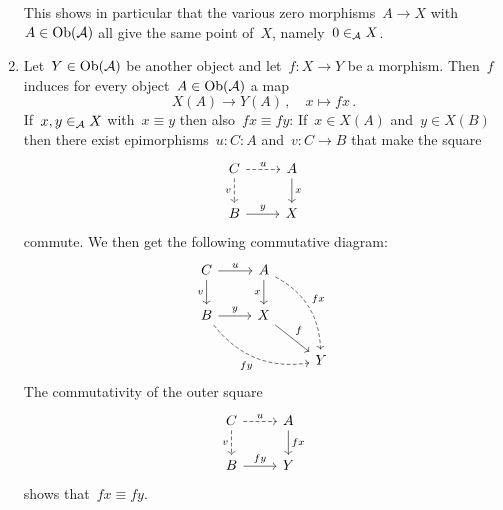 \begin{remarkdefinition}[continues=abstract points]
\begin{enumerate}[start=3]
      This shows in particular that the various zero morphisms~$A \to X$ with~$A \in \operatorname{Ob}(\mathcal{A})$ all give the same point of~$X$, namely~$0 \in_{\mathcal{A}} X$.
    \item
      Let~$Y \in \operatorname{Ob}(\mathcal{A})$ be another object and let~$f \colon X \to Y$ be a morphism.
      Then~$f$ induces for every object~$A \in \operatorname{Ob}(\mathcal{A})$ a map
      \[
                X(A)
        \to     Y(A) \,,
        \quad   x
        \mapsto fx \,.
      \]
      If~$x, y \in_{\mathcal{A}} X$ with~$x \equiv y$ then also~$fx \equiv fy$:
      If~$x \in X(A)$ and~$y \in X(B)$ then there exist epimorphisms~$u \colon C \colon A$ and~$v \colon C \to B$ that make the square
      \[
        \begin{tikzcd}
            C
            \arrow[dashed]{r}[above]{u}
            \arrow[dashed]{d}[left]{v}
          & A
            \arrow{d}[right]{x}
          \\
            B
            \arrow{r}[above]{y}
          & X
        \end{tikzcd}
      \]
      commute.
      We then get the following commutative diagram:
      \[
        \begin{tikzcd}
            C
            \arrow{r}[above]{u}
            \arrow{d}[left]{v}
          & A
            \arrow[dashed, bend left]{ddr}[above right]{fx}
            \arrow{d}[left]{x}
          & {}
          \\
            B
            \arrow{r}[above]{y}
            \arrow[dashed, bend right]{drr}[below left]{fy}
          & X
            \arrow{dr}[above right]{f}
          & {}
          \\
            {}
          & {}
          & Y
        \end{tikzcd}
      \]
      The commutativity of the outer square
      \[
        \begin{tikzcd}
            C
            \arrow[dashed]{r}[above]{u}
            \arrow[dashed]{d}[left]{v}
          & A
            \arrow{d}[right]{fx}
          \\
            B
            \arrow{r}[above]{fy}
          & Y
        \end{tikzcd}
      \]
      shows that~$fx \equiv fy$.
  \end{enumerate}
\end{remarkdefinition}


